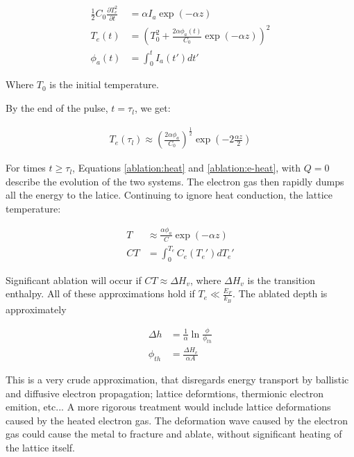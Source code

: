         \begin{align}
            \frac{1}{2}C_0\frac{\partial T_e^2}{\partial t} &= \alpha I_a \exp(-\alpha z) \\
            T_e(t) &= \left(T_0^2 + \frac{2\alpha\phi_a(t)}{C_0}\exp(-\alpha z)\right)^2 \\
            \phi_a(t) &= \int_0^t I_a(t')dt'
        \end{align}

        Where $T_0$ is the initial temperature.

        By the end of the pulse, $t = \tau_l$, we get:

        \begin{align}
            T_e(\tau_l) \approx \left(\frac{2\alpha\phi_a}{C_0}\right)^{\frac{1}{2}}\exp\left(-2\frac{\alpha z}{2}\right)
        \end{align}

        For times $t \geq \tau_l$, Equations \ref{ablation:heat} and \ref{ablation:e-heat}, with $Q = 0$ describe the evolution of the
        two systems. The electron gas then rapidly dumps all the energy to the latice. Continuing to ignore heat conduction, the lattice
        temperature:

        \begin{align}
            T &\approx \frac{\alpha \phi_a}{C}\exp(-\alpha z) \\
            CT &= \int_0^{T_e} C_e(T_e')dT_e'
        \end{align}

        Significant ablation will occur if $CT \approx \Delta H_v$, where $\Delta H_v$ is the transition enthalpy. All of these approximations
        hold if $T_e \ll \frac{E_F}{k_B}$. The ablated depth is approximately

        \begin{align}
            \Delta h &= \frac{1}{\alpha}\ln\frac{\phi}{\phi_{th}}\\
            \phi_{th} &= \frac{\Delta H_v}{\alpha A}
        \end{align}

        This is a very crude approximation, that disregards energy transport by ballistic and diffusive electron propagation; lattice deformtions,
        thermionic electron emition, etc... A more rigorous treatment would include lattice deformations caused by the heated electron gas. The
        deformation wave caused by the electron gas could cause the metal to fracture and ablate, without significant heating of the lattice itself.

